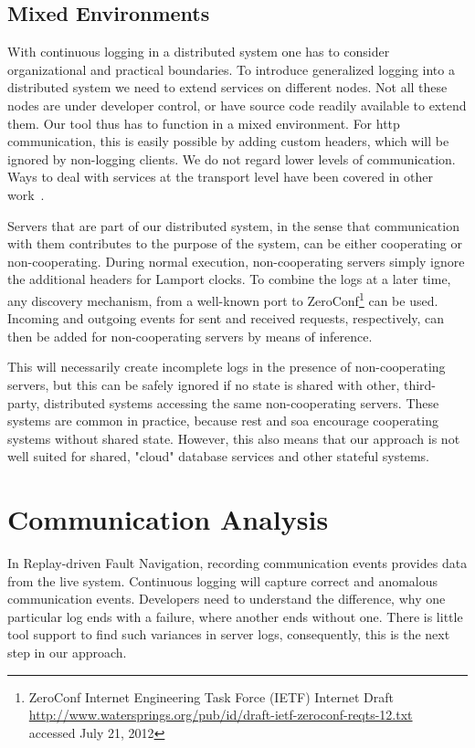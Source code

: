 \subsection{Mixed Environments}
\label{sec:mixed-environments}

With continuous logging in a distributed system one has to consider
organizational and practical boundaries. To introduce generalized
logging into a distributed system we need to extend services on
different nodes. Not all these nodes are under developer control, or
have source code readily available to extend them. Our tool thus has
to function in a mixed environment. For \ac{http} communication, this
is easily possible by adding custom headers, which will be ignored by
non-logging clients. We do not regard lower levels of
communication. Ways to deal with services at the transport level have
been covered in other work~\cite{Geels2006Replay,Konuru2000}.

Servers that are part of our distributed system, in the sense that
communication with them contributes to the purpose of the system, can
be either cooperating or non-cooperating. During normal execution,
non-cooperating servers simply ignore the additional headers for
Lamport clocks. To combine the logs at a later time, any discovery
mechanism, from a well-known port to ZeroConf\footnote{ZeroConf
  Internet Engineering Task Force (IETF) Internet Draft\\
  \url{http://www.watersprings.org/pub/id/draft-ietf-zeroconf-reqts-12.txt}\\
  accessed July 21, 2012} can be used.  Incoming and outgoing events
for sent and received requests, respectively, can then be added for
non-cooperating servers by means of inference.

This will necessarily create incomplete logs in the presence of
non-cooperating servers, but this can be safely ignored if no state is
shared with other, third-party, distributed systems accessing the same
non-cooperating servers. These systems are common in practice, because
\ac{rest} and \ac{soa} encourage cooperating systems without shared
state. However, this also means that our approach is not well suited
for shared, "cloud" database services and other stateful systems.

\section{Communication Analysis}
\label{sec:comm-constr-analys}

In Replay-driven Fault Navigation, recording communication events
provides data from the live system. Continuous logging will capture
correct and anomalous communication events. Developers need to
understand the difference, why one particular log ends with a failure,
where another ends without one. There is little tool support to find
such variances in server logs, consequently, this is the next step in
our approach.

